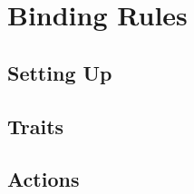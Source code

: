 \section*{Binding Rules}

\begin{multicols}{2}

\subsection*{Setting Up}



\subsection*{Traits}





\end{multicols}

\mentalSkillChart

\begin{multicols}{2}

\subsection*{Actions}








\end{multicols}

\physicalSkillChart

